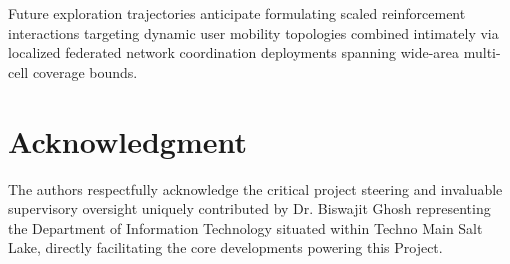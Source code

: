 \documentclass[conference]{IEEEtran}
\begin{document}
Future exploration trajectories anticipate formulating scaled reinforcement interactions targeting dynamic user mobility topologies combined intimately via localized federated network coordination deployments spanning wide-area multi-cell coverage bounds.


\section*{Acknowledgment}
The authors respectfully acknowledge the critical project steering and invaluable supervisory oversight uniquely contributed by Dr. Biswajit Ghosh representing the Department of Information Technology situated within Techno Main Salt Lake, directly facilitating the core developments powering this Project.
\end{document}
